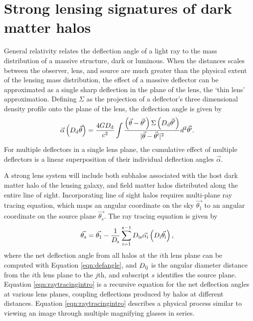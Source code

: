 \section{Strong lensing signatures of dark matter halos}
\indent General relativity relates the deflection angle of a light ray to the mass distribution of a massive structure, dark or luminous. When the distances scales between the observer, lens, and source are much greater than the physical extent of the lensing mass distribution, the effect of a massive deflector can be approximated as a single sharp deflection in the plane of the lens, the `thin lens' approximation. Defining $\Sigma$ as the projection of a deflector's three dimensional density profile onto the plane of the lens, the deflection angle is given by \cite{BlandfordNarayan86,Schnedier1997}
\begin{equation}
\label{eqn:defangle}
\vec{\alpha}\left(D_{\rm{d}} \vec{\theta}\right) = \frac{4G D_{\rm{d}}}{c^2} \int \frac{\left(\vec{\theta} - \vec{\theta}^{\prime}\right) \Sigma\left(D_{\rm{d}}\vec{\theta}^{\prime}\right)}{|\vec{\theta} - \vec{\theta}^{\prime}|^2} d^2 \vec{\theta^{\prime}}. 
\end{equation}
For multiple deflectors in a single lens plane, the cumulative effect of multiple deflectors is a linear superposition of their individual deflection angles $\vec{\alpha}$. 

A strong lens system will include both subhalos associated with the host dark matter halo of the lensing galaxy, and field matter halos distributed along the entire line of sight. Incorporating line of sight halos requires multi-plane ray tracing equation, which maps an angular coordinate on the sky $\vec{\theta_1}$ to an angular coordinate on the source plane $\vec{\theta_s}$. The ray tracing equation is given by \cite{BlandfordNarayan86}
\begin{equation}
\label{eqn:raytracingintro}
\vec{\theta_s} = \vec{\theta_1} - \frac{1}{D_{\rm{s}}} \sum_{i=1}^{s-1} D_{\rm{is}}{\vec{\alpha_{\rm{i}}}} \left(D_{\rm{i}} \vec{\theta_{\rm{i}}}\right),
\end{equation} 
where the net deflection angle from all halos at the $i$th lens plane can be computed with Equation \ref{eqn:defangle}, and $D_{\rm{ij}}$ is the angular diameter distance from the $i$th lens plane to the $j$th, and subscript $s$ identifies the source plane. Equation \ref{eqn:raytracingintro} is a recursive equation for the net deflection angles at various lens planes, coupling deflections produced by halos at different distances. Equation \ref{eqn:raytracingintro} describes a physical process similar to viewing an image through multiple magnifying glasses in series. 

